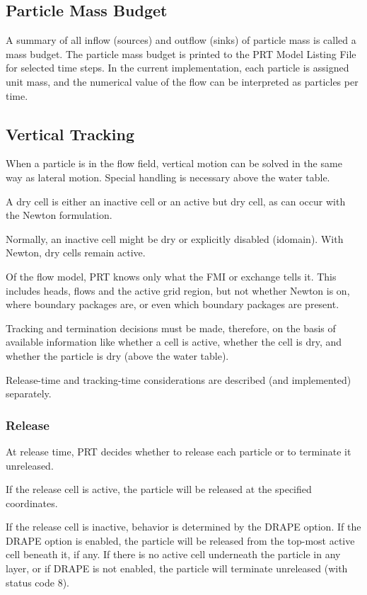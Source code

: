 \subsection{Particle Mass Budget}
A summary of all inflow (sources) and outflow (sinks) of particle mass is called a mass budget.  The particle mass budget is printed to the PRT Model Listing File for selected time steps.  In the current implementation, each particle is assigned unit mass, and the numerical value of the flow can be interpreted as particles per time.

\subsection{Vertical Tracking}

When a particle is in the flow field, vertical motion can be solved in the same way as lateral motion. Special handling is necessary above the water table.

A dry cell is either an inactive cell or an active but dry cell, as can occur with the Newton formulation.

Normally, an inactive cell might be dry or explicitly disabled (idomain).  With Newton, dry cells remain active.

Of the flow model, PRT knows only what the FMI or exchange tells it. This includes heads, flows and the active grid region, but not whether Newton is on, where boundary packages are, or even which boundary packages are present.

Tracking and termination decisions must be made, therefore, on the basis of available information like whether a cell is active, whether the cell is dry, and whether the particle is dry (above the water table).

Release-time and tracking-time considerations are described (and implemented) separately.

\subsubsection{Release}

At release time, PRT decides whether to release each particle or to terminate it unreleased.

If the release cell is active, the particle will be released at the specified coordinates.

If the release cell is inactive, behavior is determined by the DRAPE option. If the DRAPE option is enabled, the particle will be released from the top-most active cell beneath it, if any. If there is no active cell underneath the particle in any layer, or if DRAPE is not enabled, the particle will terminate unreleased (with status code 8).

